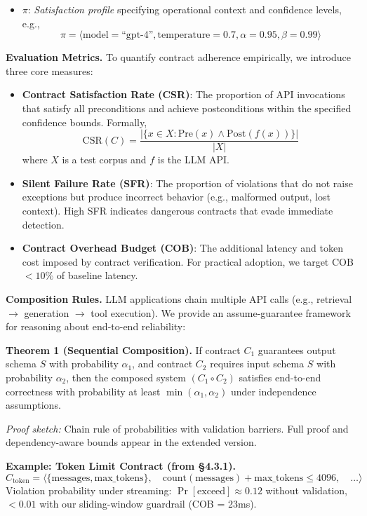 \documentclass[11pt]{article}
\begin{document}
\begin{itemize}
\item $\pi$: \textit{Satisfaction profile} specifying operational context and confidence levels, e.g.,
  \[
  \pi = \langle \text{model}=\text{``gpt-4''}, \text{temperature}=0.7, \alpha=0.95, \beta=0.99 \rangle
  \]
\end{itemize}

\textbf{Evaluation Metrics.} To quantify contract adherence empirically, we introduce three core measures:

\begin{itemize}
\item \textbf{Contract Satisfaction Rate (CSR)}: The proportion of API invocations that satisfy all preconditions and achieve postconditions within the specified confidence bounds. Formally,
\[
\text{CSR}(C) = \frac{|\{x \in X : \text{Pre}(x) \land \text{Post}(f(x))\}|}{|X|}
\]
where $X$ is a test corpus and $f$ is the LLM API.

\item \textbf{Silent Failure Rate (SFR)}: The proportion of violations that do not raise exceptions but produce incorrect behavior (e.g., malformed output, lost context). High SFR indicates dangerous contracts that evade immediate detection.

\item \textbf{Contract Overhead Budget (COB)}: The additional latency and token cost imposed by contract verification. For practical adoption, we target COB $< 10\%$ of baseline latency.
\end{itemize}

\textbf{Composition Rules.} LLM applications chain multiple API calls (e.g., retrieval $\to$ generation $\to$ tool execution). We provide an assume-guarantee framework for reasoning about end-to-end reliability:

\textbf{Theorem 1 (Sequential Composition).} If contract $C_1$ guarantees output schema $S$ with probability $\alpha_1$, and contract $C_2$ requires input schema $S$ with probability $\alpha_2$, then the composed system $(C_1 \circ C_2)$ satisfies end-to-end correctness with probability at least $\min(\alpha_1, \alpha_2)$ under independence assumptions.

\textit{Proof sketch:} Chain rule of probabilities with validation barriers. Full proof and dependency-aware bounds appear in the extended version.

\textbf{Example: Token Limit Contract (from \S4.3.1).}
\[
C_{\text{token}} = \langle \{ \text{messages}, \text{max\_tokens} \}, \quad \text{count}(\text{messages}) + \text{max\_tokens} \leq 4096, \quad \ldots \rangle
\]
Violation probability under streaming: $\Pr[\text{exceed}] \approx 0.12$ without validation, $< 0.01$ with our sliding-window guardrail (COB = 23ms).
\end{document}

